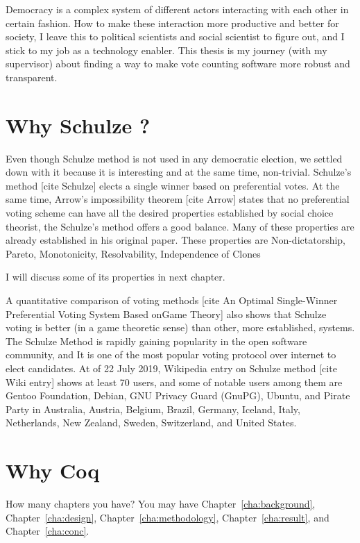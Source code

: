Democracy is a complex system of different actors interacting with each other in certain fashion.  How to make 
these interaction more productive and better for society, I leave this to political scientists and social scientist
to figure out, and I stick to my job as a technology enabler.  This thesis is  my journey 
(with my supervisor) about finding  a way to make vote counting software more robust and transparent.




\section{Why Schulze ?}
\label{sec:thesisstatement}
Even though Schulze method is not used in any democratic election, we settled down 
with it because it is interesting  and at the same time, non-trivial. 
 Schulze's method [cite Schulze]  elects  a single winner based on 
preferential votes.  At the same time, Arrow's impossibility theorem [cite Arrow]  states that no preferential voting 
scheme can have all the desired properties established by  social choice theorist,
the Schulze's method offers a good balance. Many of these properties are already 
established in his original paper. These properties are Non-dictatorship,  Pareto,  Monotonicity, 
Resolvability, Independence of Clones 

I will discuss some of its properties in next chapter. 


A  quantitative  comparison of voting methods 
[cite An Optimal Single-Winner Preferential Voting System Based onGame Theory]  also shows that 
Schulze voting is better (in a game theoretic sense) than other, more established, systems.  The 
Schulze Method is rapidly gaining popularity in the open software community, and It is one of the most 
popular voting protocol over internet to elect candidates. At of 22 July 2019, Wikipedia entry on Schulze 
method [cite Wiki entry] shows at least 70 users, and some of 
notable users among them are Gentoo Foundation, Debian, GNU Privacy Guard (GnuPG), Ubuntu, and 
Pirate Party in Australia, Austria, Belgium, Brazil, Germany, Iceland, Italy, 
Netherlands, New Zealand, Sweden, Switzerland, and United States.  






\section{Why Coq}
\label{sec:outline}
How many chapters you have? You may have Chapter~\ref{cha:background},
Chapter~\ref{cha:design}, Chapter~\ref{cha:methodology},
Chapter~\ref{cha:result}, and Chapter~\ref{cha:conc}.
